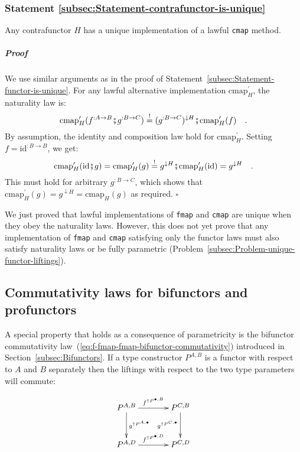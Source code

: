 \subsubsection{Statement \label{subsec:Statement-contrafunctor-is-unique}\ref{subsec:Statement-contrafunctor-is-unique}}

Any contrafunctor $H$ has a unique implementation of a lawful \lstinline!cmap!
method. 

\subparagraph{Proof}

We use similar arguments as in the proof of Statement~\ref{subsec:Statement-functor-is-unique}.
For any lawful alternative implementation $\text{cmap}_{H}^{\prime}$,
the naturality law is:
\[
\text{cmap}_{H}^{\prime}(f^{:A\rightarrow B}\bef g^{:B\rightarrow C})\overset{!}{=}(g^{:B\rightarrow C})^{\downarrow H}\bef\text{cmap}_{H}^{\prime}(f)\quad.
\]
By assumption, the identity and composition law hold for $\text{cmap}_{H}^{\prime}$.
Setting $f=\text{id}^{:B\rightarrow B}$, we get:
\[
\text{cmap}_{H}^{\prime}(\text{id}\bef g)=\text{cmap}_{H}^{\prime}(g)\overset{!}{=}g^{\downarrow H}\bef\text{cmap}_{H}^{\prime}(\text{id})=g^{\downarrow H}\quad.
\]
This must hold for arbitrary $g^{:B\rightarrow C}$, which shows that
$\text{cmap}_{H}^{\prime}(g)=g^{\downarrow H}=\text{cmap}_{H}(g)$
as required. $\square$

We just proved that lawful implementations of \lstinline!fmap! and
\lstinline!cmap! are unique when they obey the naturality laws. However,
this does not yet prove that any implementation of \lstinline!fmap!
and \lstinline!cmap! satisfying only the functor laws must also satisfy
naturality laws or be fully parametric (Problem~\ref{subsec:Problem-unique-functor-liftings}).

\subsection{Commutativity laws for bifunctors and profunctors\label{sec:Commutativity-laws-for-type-constructors}}

A special property that holds as a consequence of parametricity is
the bifunctor commutativity law~(\ref{eq:f-fmap-fmap-bifunctor-commutativity})
introduced in Section~\ref{subsec:Bifunctors}. If a type constructor
$P^{A,B}$ is a functor with respect to $A$ and $B$ separately then
the liftings with respect to the two type parameters will commute:

\begin{wrapfigure}{l}{0.28\columnwidth}%
\vspace{-1.9\baselineskip}
\[
\xymatrix{\xyScaleY{2.5pc}\xyScaleX{3.0pc}P^{A,B}\ar[r]\sp(0.5){f^{\uparrow P^{\bullet,B}}}\ar[d]\sp(0.45){g^{\uparrow P^{A,\bullet}}} & P^{C,B}\ar[d]\sb(0.45){g^{\uparrow P^{C,\bullet}}}\\
P^{A,D}\ar[r]\sp(0.5){f^{\uparrow P^{\bullet,D}}} & P^{C,D}
}
\]

\vspace{-1\baselineskip}
\end{wrapfigure}%

